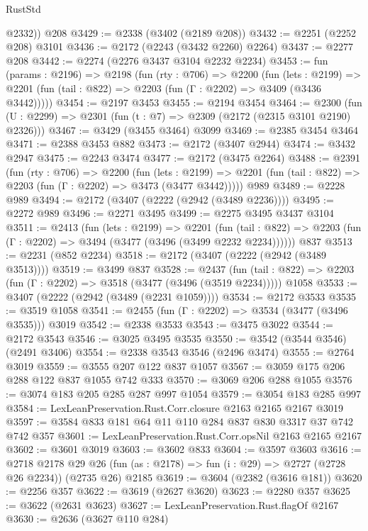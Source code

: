 \begin{lexlean}{RustStd}
\begin{coremodule}
        @2332))
    @208
@3429 := @2338 (@3402 (@2189 @208))
@3432 := @2251 (@2252 @208) @3101
@3436 := @2172 (@2243 (@3432 @2260) @2264)
@3437 := @2277 @208
@3442 := @2274 (@2276 @3437 @3104 @2232 @2234)
@3453 := fun (params : @2196) =>
  @2198
    (fun (rty : @706) =>
    @2200
      (fun (lets : @2199) =>
      @2201 (fun (tail : @822) => @2203 (fun (Γ : @2202) => @3409 (@3436 @3442)))))
@3454 := @2197 @3453
@3455 := @2194 @3454
@3464 := @2300 (fun (U : @2299) => @2301 (fun (t : @7) => @2309 (@2172 (@2315 @3101 @2190) @2326)))
@3467 := @3429 (@3455 @3464) @3099
@3469 := @2385 @3454 @3464
@3471 := @2388 @3453 @882
@3473 := @2172 (@3407 @2944)
@3474 := @3432 @2947
@3475 := @2243 @3474
@3477 := @2172 (@3475 @2264)
@3488 := @2391
    (fun (rty : @706) =>
    @2200
      (fun (lets : @2199) =>
      @2201 (fun (tail : @822) => @2203 (fun (Γ : @2202) => @3473 (@3477 @3442)))))
    @989
@3489 := @2228 @989
@3494 := @2172 (@3407 (@2222 (@2942 (@3489 @2236))))
@3495 := @2272 @989
@3496 := @2271 @3495
@3499 := @2275 @3495 @3437 @3104
@3511 := @2413
    (fun (lets : @2199) =>
    @2201
      (fun (tail : @822) => @2203 (fun (Γ : @2202) => @3494 (@3477 (@3496 (@3499 @2232 @2234))))))
    @837
@3513 := @2231 (@852 @2234)
@3518 := @2172 (@3407 (@2222 (@2942 (@3489 @3513))))
@3519 := @3499 @837
@3528 := @2437
    (fun (tail : @822) => @2203 (fun (Γ : @2202) => @3518 (@3477 (@3496 (@3519 @2234)))))
    @1058
@3533 := @3407 (@2222 (@2942 (@3489 (@2231 @1059))))
@3534 := @2172 @3533
@3535 := @3519 @1058
@3541 := @2455 (fun (Γ : @2202) => @3534 (@3477 (@3496 @3535))) @3019
@3542 := @2338 @3533
@3543 := @3475 @3022
@3544 := @2172 @3543
@3546 := @3025 @3495 @3535
@3550 := @3542 (@3544 @3546) (@2491 @3406)
@3554 := @2338 @3543 @3546 (@2496 @3474)
@3555 := @2764 @3019
@3559 := @3555 @207 @122 @837 @1057
@3567 := @3059 @175 @206 @288 @122 @837 @1055 @742 @333
@3570 := @3069 @206 @288 @1055
@3576 := @3074 @183 @205 @285 @287 @997 @1054
@3579 := @3054 @183 @285 @997
@3584 := LexLeanPreservation.Rust.Corr.closure @2163 @2165 @2167 @3019
@3597 := @3584 @833 @181 @64 @11 @110 @284 @837 @830 @3317 @37 @742 @742 @357
@3601 := LexLeanPreservation.Rust.Corr.opsNil @2163 @2165 @2167
@3602 := @3601 @3019
@3603 := @3602 @833
@3604 := @3597 @3603
@3616 := @2718
    @2178
    @29
    @26
    (fun (as : @2178) => fun (i : @29) => @2727 (@2728 @26 @2234))
    (@2735 @26)
    @2185
@3619 := @3604 (@2382 (@3616 @181))
@3620 := @2256 @357
@3622 := @3619 (@2627 @3620)
@3623 := @2280 @357
@3625 := @3622 (@2631 @3623)
@3627 := LexLeanPreservation.Rust.flagOf @2167
@3630 := @2636 (@3627 @110 @284)

\end{coremodule}
\end{lexlean}
